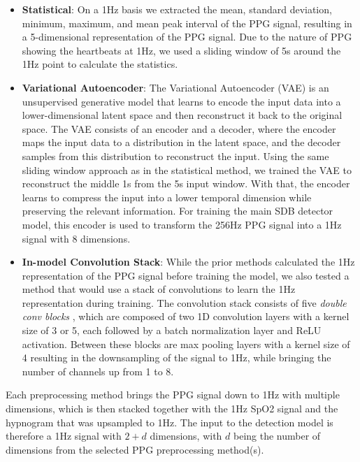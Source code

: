 \begin{itemize}
    \item \textbf{Statistical}: On a 1Hz basis we extracted the mean, standard deviation, minimum, maximum, and mean peak interval of the PPG signal, resulting in a 5-dimensional representation of the PPG signal. Due to the nature of PPG showing the heartbeats at 1Hz, we used a sliding window of 5s around the 1Hz point to calculate the statistics.
    \item \textbf{Variational Autoencoder}: The Variational Autoencoder (VAE) is an unsupervised generative model that learns to encode the input data into a lower-dimensional latent space and then reconstruct it back to the original space. The VAE consists of an encoder and a decoder, where the encoder maps the input data to a distribution in the latent space, and the decoder samples from this distribution to reconstruct the input. Using the same sliding window approach as in the statistical method, we trained the VAE to reconstruct the middle 1s from the 5s input window. With that, the encoder learns to compress the input into a lower temporal dimension while preserving the relevant information. For training the main SDB detector model, this encoder is used to transform the 256Hz PPG signal into a 1Hz signal with 8 dimensions.
    \item \textbf{In-model Convolution Stack}: While the prior methods calculated the 1Hz representation of the PPG signal before training the model, we also tested a method that would use a stack of convolutions to learn the 1Hz representation during training. The convolution stack consists of five \textit{double conv blocks} , which are composed of two 1D convolution layers with a kernel size of 3 or 5, each followed by a batch normalization layer and ReLU activation. Between these blocks are max pooling layers with a kernel size of 4 resulting in the downsampling of the signal to 1Hz, while bringing the number of channels up from 1 to 8.
\end{itemize}

Each preprocessing method brings the PPG signal down to 1Hz with multiple dimensions, which is then stacked together with the 1Hz SpO2 signal and the hypnogram that was upsampled to 1Hz. The input to the detection model is therefore a 1Hz signal with $2+d$ dimensions, with $d$ being the number of dimensions from the selected PPG preprocessing method(s). 

